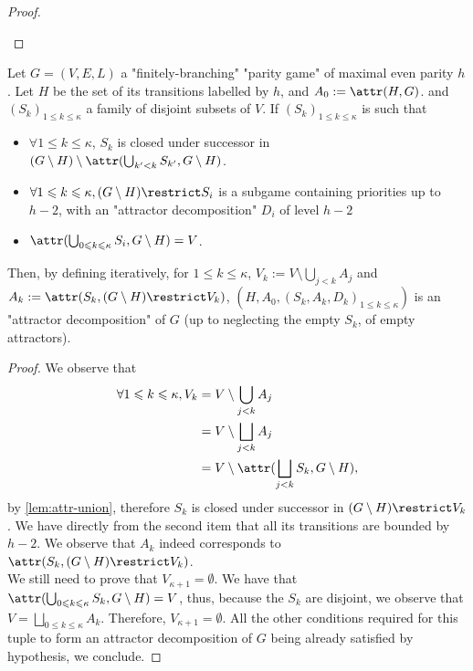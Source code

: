 \documentclass[a4paper,UKenglish,cleveref, autoref, thm-restate]{lipics-v2021}
\renewcommand{\leq}{\leqslant}
\begin{document}
\begin{proof}
\begin{itemize}
	\end{itemize}
\end{proof}


\begin{lemma}\label{lem:join-attr-decomp}
	Let $G = (V,E,L)$ a "finitely-branching" "parity game" of maximal even parity $h$. Let $H$ be the set of its transitions labelled by $h$, and $A_0 := \attr(H,G)$. and $(S_k)_{1\leq k\leq\kappa}$ a family of disjoint subsets of $V$. If $(S_k)_{1\leq k \leq \kappa}$ is such that
	\begin{itemize}
		\item $\forall 1 \leq k \leq \kappa$, $S_k$ is closed under successor in $(G\setminus H)\setminus \attr(\bigcup_{k'<k} S_{k'}, G\setminus H)$.
		\item $\forall 1\leq k \leq \kappa, (G\setminus H)\restrict S_i$ is a subgame containing priorities up to $h-2$, with an "attractor decomposition" $D_i$ of level $h-2$
		\item $\attr(\bigcup_{0\leq k\leq\kappa}S_i,G\setminus H) = V$.
	\end{itemize}
	Then, by defining iteratively, for $1\leq k \leq \kappa$, $V_k:=V\setminus \bigcup_{j< k}A_j$ and $A_k := \attr(S_k,(G\setminus H)\restrict V_k)$, $(H,A_0, (S_k,A_k,D_k)_{1\leq k \leq \kappa})$ is an "attractor decomposition" of $G$ (up to neglecting the empty $S_k$, of empty attractors).
\end{lemma}
\begin{proof}
	We observe that
	\begin{align*}
		\forall 1\leq k \leq \kappa, V_k &= V\setminus \bigcup_{j< k}A_j\\
		&= V\setminus \bigsqcup_{j< k}A_j\\
		&= V \setminus \attr(\bigsqcup_{j<k}S_k,G\setminus H),
	\end{align*} by \cref{lem:attr-union}, therefore $S_k$ is closed under successor in $(G\setminus H)\restrict V_k$. We have directly from the second item that all its transitions are bounded by $h-2$. We observe that $A_k$ indeed corresponds to $\attr(S_k,(G\setminus H)\restrict V_k)$.\\
	We still need to prove that $V_{\kappa+1} = \emptyset$.
	We have that $\attr(\bigcup_{0\leq k\leq\kappa}S_k,G\setminus H) = V$, thus, because the $S_k$ are disjoint, we observe that $V = \bigsqcup_{0\leq k \leq \kappa} A_k$. Therefore, $V_{\kappa+1} = \emptyset$.
	All the other conditions required for this tuple to form an attractor decomposition of $G$ being already satisfied by hypothesis, we conclude.
\end{proof}
\end{document}
